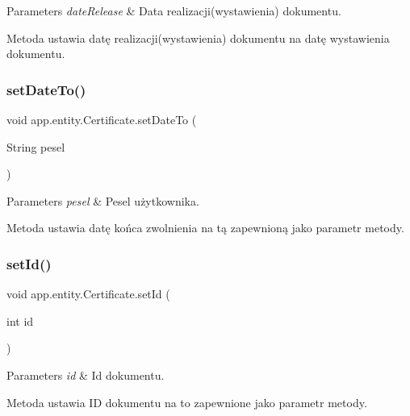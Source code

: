 \begin{DoxyParams}{Parameters}
{\em date\+Release} & Data realizacji(wystawienia) dokumentu.\\
\hline
\end{DoxyParams}
Metoda ustawia datę realizacji(wystawienia) dokumentu na datę wystawienia dokumentu. \mbox{\label{classapp_1_1entity_1_1_certificate_ac779576209ad884b893ef051fea3d1ac}} 
\subsubsection{\texorpdfstring{setDateTo()}{setDateTo()}}
{\footnotesize\ttfamily void app.\+entity.\+Certificate.\+set\+Date\+To (\begin{DoxyParamCaption}\item[{String}]{pesel }\end{DoxyParamCaption})}


\begin{DoxyParams}{Parameters}
{\em pesel} & Pesel użytkownika.\\
\hline
\end{DoxyParams}
Metoda ustawia datę końca zwolnienia na tą zapewnioną jako parametr metody. \mbox{\label{classapp_1_1entity_1_1_certificate_a17bdfc9e4693f1590de09ee6ddda1bda}} 
\subsubsection{\texorpdfstring{setId()}{setId()}}
{\footnotesize\ttfamily void app.\+entity.\+Certificate.\+set\+Id (\begin{DoxyParamCaption}\item[{int}]{id }\end{DoxyParamCaption})}


\begin{DoxyParams}{Parameters}
{\em id} & Id dokumentu.\\
\hline
\end{DoxyParams}
Metoda ustawia ID dokumentu na to zapewnione jako parametr metody. \mbox{\label{classapp_1_1entity_1_1_certificate_ad2cb00c865b1570b1b7876c1862e242f}} 
